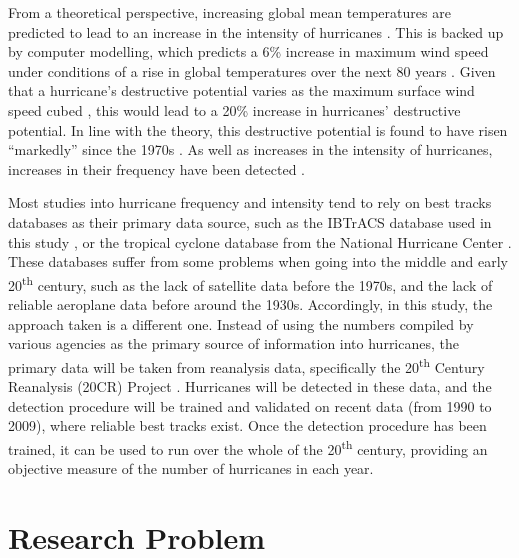 \documentclass[pdftex,12pt,a4paper]{report}
\newcommand{\ts}{\textsuperscript}
\begin{document}
From a theoretical perspective, increasing global mean temperatures are predicted to lead to an
increase in the intensity of hurricanes \parencite{emanuelDependence1987}. This is backed up by
computer modelling, which predicts a 6\% increase in maximum wind speed under conditions of a rise
in global temperatures over the next 80 years \parencite{knutsonImpact2004}. Given that a
hurricane's destructive potential varies as the maximum surface wind speed cubed
\parencite{emanuelIncreasing2005}, this would lead to a 20\% increase in hurricanes' destructive
potential. In line with the theory, this destructive potential is found to have risen ``markedly''
since the 1970s \parencite{emanuelIncreasing2005}. As well as increases in the intensity of
hurricanes, increases in their frequency have been detected \parencite{goldbergRecent2001,
websterChanges2005, hollandHeightened2007}.

Most studies into hurricane frequency and intensity tend to rely on best tracks databases as their
primary data source, such as the IBTrACS database used in this study
\parencite{knappInternational2010}, or the tropical cyclone database from the National Hurricane
Center \parencite{jarvinianTropical1984}. These databases suffer from some problems when going into
the middle and early 20\ts{th} century, such as the lack of satellite data before the 1970s, and the
lack of reliable aeroplane data before around the 1930s. Accordingly, in this study, the approach
taken is a different one. Instead of using the numbers compiled by various agencies as the primary
source of information into hurricanes, the primary data will be taken from reanalysis data,
specifically the 20\ts{th} Century Reanalysis (20CR) Project \parencite{compoTwentieth2011}.
Hurricanes will be detected in these data, and the detection procedure will be trained and validated
on recent data (from 1990 to 2009), where reliable best tracks exist. Once the detection procedure
has been trained, it can be used to run over the whole of the 20\ts{th} century, providing an
objective measure of the number of hurricanes in each year.

\section{Research Problem}
\end{document}
